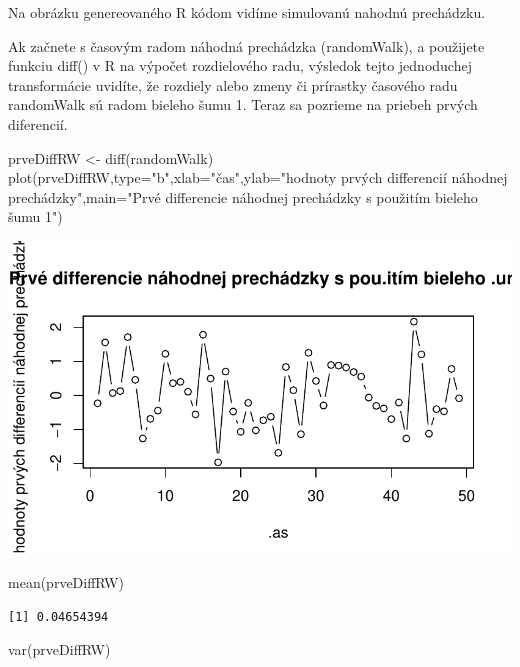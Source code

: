 \documentclass[
  letterpaper,
  DIV=11,
  numbers=noendperiod]{scrreprt}
\newenvironment{Shaded}{\begin{snugshade}}{\end{snugshade}}
\newcommand{\AttributeTok}[1]{\textcolor[rgb]{0.40,0.45,0.13}{#1}}
\newcommand{\FunctionTok}[1]{\textcolor[rgb]{0.28,0.35,0.67}{#1}}
\newcommand{\NormalTok}[1]{\textcolor[rgb]{0.00,0.23,0.31}{#1}}
\newcommand{\OtherTok}[1]{\textcolor[rgb]{0.00,0.23,0.31}{#1}}
\newcommand{\StringTok}[1]{\textcolor[rgb]{0.13,0.47,0.30}{#1}}
\begin{document}
Na obrázku genereovaného R kódom vidíme simulovanú nahodnú prechádzku.

Ak začnete s časovým radom náhodná prechádzka (randomWalk), a použijete
funkciu diff() v R na výpočet rozdielového radu, výsledok tejto
jednoduchej transformácie uvidíte, že rozdiely alebo zmeny či prírastky
časového radu randomWalk sú radom bieleho šumu 1. Teraz sa pozrieme na
priebeh prvých diferencií.

\begin{Shaded}
\begin{Highlighting}[]
\NormalTok{prveDiffRW }\OtherTok{\textless{}{-}} \FunctionTok{diff}\NormalTok{(randomWalk)}
\FunctionTok{plot}\NormalTok{(prveDiffRW,}\AttributeTok{type=}\StringTok{"b"}\NormalTok{,}\AttributeTok{xlab=}\StringTok{"čas"}\NormalTok{,}\AttributeTok{ylab=}\StringTok{"hodnoty prvých differencií náhodnej prechádzky"}\NormalTok{,}\AttributeTok{main=}\StringTok{"Prvé differencie náhodnej prechádzky s použitím bieleho šumu 1"}\NormalTok{)}
\end{Highlighting}
\end{Shaded}

\includegraphics{prednaska3_NahodnaPrechadzkaStacionarita_files/figure-pdf/unnamed-chunk-7-1.pdf}

\begin{Shaded}
\begin{Highlighting}[]
\FunctionTok{mean}\NormalTok{(prveDiffRW)}
\end{Highlighting}
\end{Shaded}

\begin{verbatim}
[1] 0.04654394
\end{verbatim}

\begin{Shaded}
\begin{Highlighting}[]
\FunctionTok{var}\NormalTok{(prveDiffRW)}
\end{Highlighting}
\end{Shaded}
\end{document}
